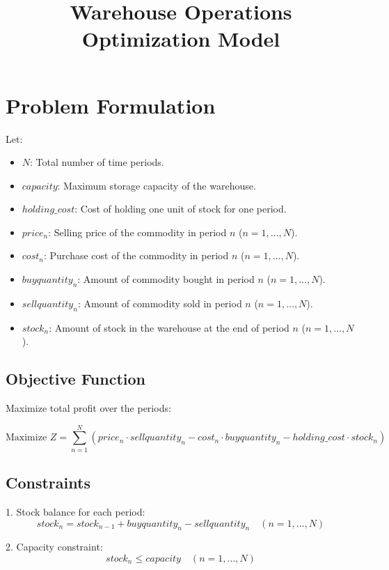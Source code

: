 \documentclass{article}
\begin{document}
\title{Warehouse Operations Optimization Model}
\author{}
\date{}
\maketitle

\section*{Problem Formulation}

Let:
\begin{itemize}
    \item $N$: Total number of time periods.
    \item $capacity$: Maximum storage capacity of the warehouse.
    \item $holding\_cost$: Cost of holding one unit of stock for one period.
    \item $price_n$: Selling price of the commodity in period $n$ ($n = 1, \ldots, N$).
    \item $cost_n$: Purchase cost of the commodity in period $n$ ($n = 1, \ldots, N$).
    \item $buyquantity_n$: Amount of commodity bought in period $n$ ($n = 1, \ldots, N$).
    \item $sellquantity_n$: Amount of commodity sold in period $n$ ($n = 1, \ldots, N$).
    \item $stock_n$: Amount of stock in the warehouse at the end of period $n$ ($n = 1, \ldots, N$).
\end{itemize}

\subsection*{Objective Function}

Maximize total profit over the periods:

\[
\text{Maximize } Z = \sum_{n=1}^{N} \left( price_n \cdot sellquantity_n - cost_n \cdot buyquantity_n - holding\_cost \cdot stock_n \right)
\]

\subsection*{Constraints}

1. Stock balance for each period:
\[
stock_n = stock_{n-1} + buyquantity_n - sellquantity_n \quad (n = 1, \ldots, N)
\]

2. Capacity constraint:
\[
stock_n \leq capacity \quad (n = 1, \ldots, N)
\]
\end{document}
